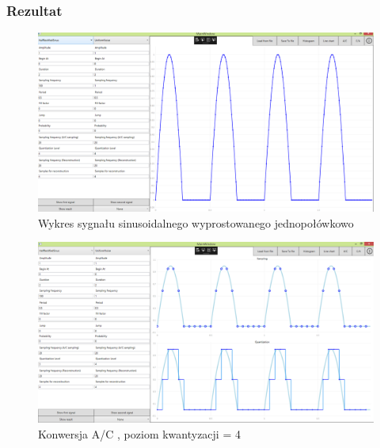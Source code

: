 \documentclass[12pt]{article}
\begin{document}
\subsubsection{Rezultat}

\begin{figure}[H]
 \centering
 \includegraphics[width=14cm]{images/hsinline.PNG}
 \vspace{-0.3cm}
 \caption{Wykres sygnału sinusoidalnego wyprostowanego jednopołówkowo}
 \label{gui}
\end{figure}

\begin{figure}[H]
 \centering
 \includegraphics[width=14cm]{images/hsinac.PNG}
 \vspace{-0.3cm}
 \caption{Konwersja A/C , poziom kwantyzacji = 4}
 \label{gui}
\end{figure}
\end{document}
